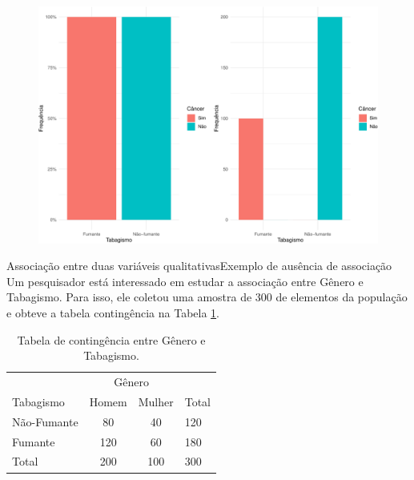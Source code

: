 \documentclass[
  10pt,
  ignorenonframetext,
]{beamer}
\begin{document}
\begin{frame}
\begin{figure}

{\centering \includegraphics[width=1\textwidth,height=\textheight]{exploracao-visualizacao_files/figure-beamer/associação de variáveis qualitativas-1.pdf}

}

\end{figure}
\end{frame}

\begin{frame}{Associação entre duas variáveis
qualitativas\newline Exemplo de ausência de associação}
\protect\hypertarget{associauxe7uxe3o-entre-duas-variuxe1veis-qualitativasexemplo-de-ausuxeancia-de-associauxe7uxe3o}{}
Um pesquisador está interessado em estudar a associação entre Gênero e
Tabagismo. Para isso, ele coletou uma amostra de 300 de elementos da
população e obteve a tabela contingência na Tabela
\ref{tab-nao-associacao}.

\begin{table}[htbp]
    \centering
    \caption{Tabela de contingência entre Gênero e Tabagismo.}
    \label{tab-nao-associacao}
    \begin{tabular}{l|cc|l}
        \toprule[0.05cm]
        & \multicolumn{2}{|c|}{Gênero} & \\ \cmidrule{2-3}
        Tabagismo & Homem & Mulher & Total\\ \midrule[0.05cm]
        Não-Fumante & 80 & 40 & 120\\
        Fumante & 120 & 60 & 180\\ \midrule[0.05cm]
        Total & 200 & 100 & 300\\ \bottomrule[0.05cm]
    \end{tabular}
\end{table}
\end{frame}
\end{document}

